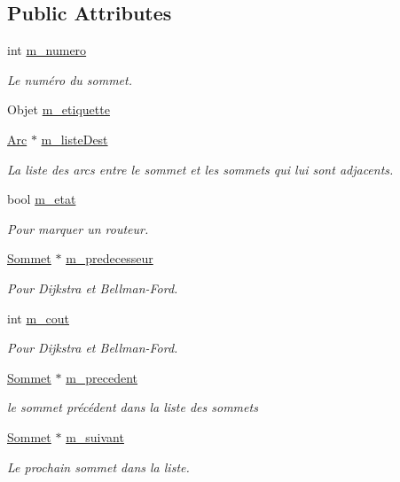 \subsection*{Public Attributes}
\begin{DoxyCompactItemize}
\item 
int \hyperlink{class_graphe_1_1_sommet_a02b6810e0eb22f2d412c60dba9e01f4d}{m\_\-numero}
\begin{DoxyCompactList}\small\item\em Le numéro du sommet. \end{DoxyCompactList}\item 
Objet \hyperlink{class_graphe_1_1_sommet_a02d396509bdc1e8bff8e26504835d13e}{m\_\-etiquette}
\item 
\hyperlink{class_graphe_1_1_arc}{Arc} $\ast$ \hyperlink{class_graphe_1_1_sommet_ab172987c3dac44234c56949387a0a2d4}{m\_\-listeDest}
\begin{DoxyCompactList}\small\item\em La liste des arcs entre le sommet et les sommets qui lui sont adjacents. \end{DoxyCompactList}\item 
bool \hyperlink{class_graphe_1_1_sommet_a8c825d391f276d2b862ec21bc3b28a37}{m\_\-etat}
\begin{DoxyCompactList}\small\item\em Pour marquer un routeur. \end{DoxyCompactList}\item 
\hyperlink{class_graphe_1_1_sommet}{Sommet} $\ast$ \hyperlink{class_graphe_1_1_sommet_ad7ba92f37fbdc082f0582e8d9e6783d5}{m\_\-predecesseur}
\begin{DoxyCompactList}\small\item\em Pour Dijkstra et Bellman-\/Ford. \end{DoxyCompactList}\item 
int \hyperlink{class_graphe_1_1_sommet_a66336413f22107bc96c1c9d95d4d3b0a}{m\_\-cout}
\begin{DoxyCompactList}\small\item\em Pour Dijkstra et Bellman-\/Ford. \end{DoxyCompactList}\item 
\hyperlink{class_graphe_1_1_sommet}{Sommet} $\ast$ \hyperlink{class_graphe_1_1_sommet_ab2a172434d603dd488664049764f8ddc}{m\_\-precedent}
\begin{DoxyCompactList}\small\item\em le sommet précédent dans la liste des sommets \end{DoxyCompactList}\item 
\hyperlink{class_graphe_1_1_sommet}{Sommet} $\ast$ \hyperlink{class_graphe_1_1_sommet_a2c2fae1f10bccddf92cb95a3b6ecbb36}{m\_\-suivant}
\begin{DoxyCompactList}\small\item\em Le prochain sommet dans la liste. \end{DoxyCompactList}\end{DoxyCompactItemize}


